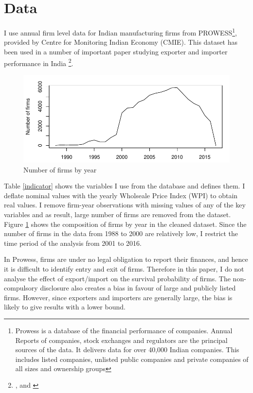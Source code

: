 \documentclass[12pt]{article}
\begin{document}
\section{Data}\label{sec:data}
I use annual firm level data for Indian manufacturing firms from
PROWESS\footnote{Prowess is a database of the financial performance of
  companies. Annual Reports of companies, stock exchanges and
  regulators are the principal sources of the data. It delivers data for over 40,000 Indian companies. This includes listed companies, unlisted public companies and private companies of all sizes and ownership groups}, provided by Centre for Monitoring Indian Economy
(CMIE). This dataset has been used in a number of important paper
studying exporter and importer performance in India \footnote{
  \textcite{de2016prices} ,\textcite{topalova2011trade} and \textcite{gupta2018exporting}}.
\begin{center}

\end{center}
\begin{center}
\begin{figure}
\includegraphics{./TABLES/compnfirms.pdf}
\caption{Number of firms by year}
\label{compnfirms}
\end{figure}
\end{center}
Table \ref{indicator}
shows the variables I use from the database and defines them.
I deflate nominal values with the yearly Wholseale Price
Index (WPI) to obtain real values. I remove firm-year observations
with missing values of any of the key variables and as result, large number of
firms are removed from the dataset. Figure \ref{compnfirms}  shows the composition of
firms by year in the cleaned dataset. Since the number of firms in the
data from 1988 to 2000 are relatively low,
 I restrict the time period of the analysis from 2001 to 2016.  
 

In Prowess, firms
are under no legal obligation to report their finances, and hence it
is difficult to identify entry and exit of firms. Therefore in this
paper, I do not analyse the effect of export/import on
the survival probability of firms. The non-compulsory disclosure also
creates a bias in favour of large and publicly listed firms. However,
since exporters and importers are generally large, the bias is likely
to give results with a lower bound.  
\end{document}
